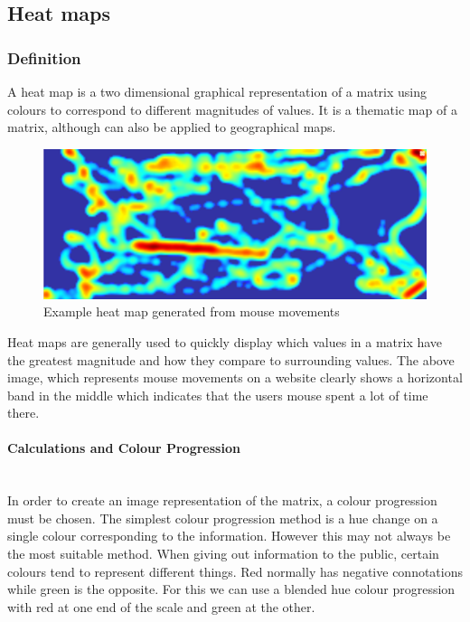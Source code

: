 \subsection{Heat maps}\label{heatmaps}

\subsubsection{Definition}\label{heatmapdefinition}

A heat map is a two dimensional graphical representation of a matrix using colours to correspond to different magnitudes of values. It is a thematic map of a matrix, although can also be applied to geographical maps. 

\begin{figure}[H]
        \begin{center}
                \includegraphics[scale=0.5]{./images/heatmaps/ExampleMouseMove.png}
                \caption{Example heat map generated from mouse movements}
        \end{center}
\end{figure}

Heat maps are generally used to quickly display which values in a matrix have the greatest magnitude and how they compare to surrounding values. The above image, which represents mouse movements on a website clearly shows a horizontal band in the middle which indicates that the users mouse spent a lot of time there. 

\paragraph{Calculations and Colour Progression} \hspace{0pt} \\


In order to create an image representation of the matrix, a colour progression must be chosen. The simplest colour progression method is a hue change on a single colour corresponding to the information. However this may not always be the most suitable method. When giving out information to the public, certain colours tend to represent different things. Red normally has negative connotations while green is the opposite. For this we can use a blended hue colour progression with red at one end of the scale and green at the other.


